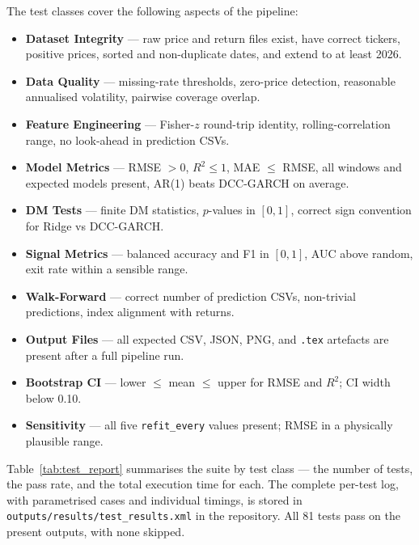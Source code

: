 The test classes cover the following aspects of the pipeline:
\begin{itemize}
    \item \textbf{Dataset Integrity} --- raw price and return files exist,
          have correct tickers, positive prices, sorted and non-duplicate dates,
          and extend to at least 2026.
    \item \textbf{Data Quality} --- missing-rate thresholds, zero-price
          detection, reasonable annualised volatility, pairwise coverage overlap.
    \item \textbf{Feature Engineering} --- Fisher-$z$ round-trip identity,
          rolling-correlation range, no look-ahead in prediction CSVs.
    \item \textbf{Model Metrics} --- RMSE $>0$, $R^2 \leq 1$, MAE $\leq$ RMSE,
          all windows and expected models present, AR(1) beats DCC-GARCH on average.
    \item \textbf{DM Tests} --- finite DM statistics, $p$-values in $[0,1]$,
          correct sign convention for Ridge vs DCC-GARCH.
    \item \textbf{Signal Metrics} --- balanced accuracy and F1 in $[0,1]$,
          AUC above random, exit rate within a sensible range.
    \item \textbf{Walk-Forward} --- correct number of prediction CSVs,
          non-trivial predictions, index alignment with returns.
    \item \textbf{Output Files} --- all expected CSV, JSON, PNG, and \texttt{.tex}
          artefacts are present after a full pipeline run.
    \item \textbf{Bootstrap CI} --- lower $\leq$ mean $\leq$ upper for RMSE and
          $R^2$; CI width below 0.10.
    \item \textbf{Sensitivity} --- all five \texttt{refit\_every} values present;
          RMSE in a physically plausible range.
\end{itemize}

Table~\ref{tab:test_report} summarises the suite by test class --- the number of
tests, the pass rate, and the total execution time for each. The complete
per-test log, with parametrised cases and individual timings, is stored in
\texttt{outputs/results/test\_results.xml} in the repository. All 81 tests pass
on the present outputs, with none skipped.



\clearpage
